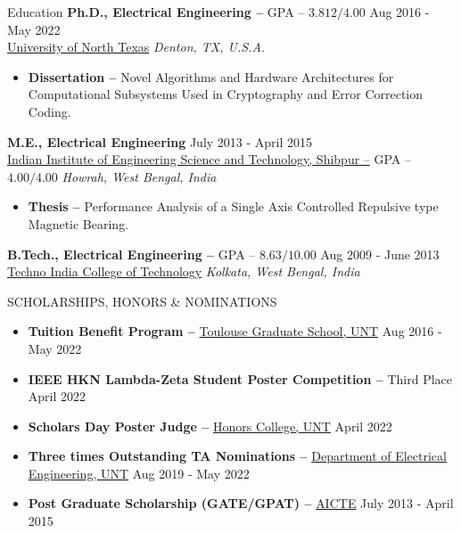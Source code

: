 \documentclass{resume} %
\begin{document}
\begin{rSection}{Education}
    \textbf{Ph.D., Electrical Engineering --} GPA -- $3.812/4.00$ \hfill Aug 2016 - May 2022 \\
    \href{https://www.unt.edu}{University of North Texas} \hfill \textit{Denton, TX, U.S.A.}
        \begin{itemize}
            \itemsep -3pt {} 
            \item \textbf{Dissertation --} Novel Algorithms and Hardware Architectures for Computational Subsystems Used in Cryptography and Error Correction Coding.
        \end{itemize}
    
    \textbf{M.E., Electrical Engineering} \hfill July 2013 - April 2015 \\
    \href{https://www.iiests.ac.in}{Indian Institute of Engineering Science and Technology, Shibpur --} GPA -- $4.00/4.00$ \hfill \textit{Howrah, West Bengal, India}
        \begin{itemize}
            \itemsep -3pt {} 
            \item \textbf{Thesis --} Performance Analysis of a Single Axis Controlled Repulsive type Magnetic Bearing.
        \end{itemize}
    
    \textbf{B.Tech., Electrical Engineering --} GPA -- $8.63/10.00$ \hfill Aug 2009 - June 2013 \\
    \href{https://tint.edu.in}{Techno India College of Technology} \hfill \textit{Kolkata, West Bengal, India}
\end{rSection}

\begin{rSection}{SCHOLARSHIPS, HONORS \& NOMINATIONS}
    \begin{itemize}
        \itemsep -3pt {} 
        \item \textbf{Tuition Benefit Program --} \href{https://tgs.unt.edu/toulouse-graduate-school}{Toulouse Graduate School, UNT} \hfill Aug 2016 - May 2022
        \item \textbf{IEEE HKN Lambda-Zeta Student Poster Competition --} Third Place \hfill April 2022
        \item \textbf{Scholars Day Poster Judge --} \href{https://honors.unt.edu}{Honors College, UNT} \hfill April 2022
        \item \textbf{Three times Outstanding TA Nominations --} \href{https://electrical.engineering.unt.edu}{Department of Electrical Engineering, UNT} \hfill Aug 2019 - May 2022
        \item \textbf{Post Graduate Scholarship (GATE/GPAT) --} \href{https://www.aicte-india.org/schemes/students-development-schemes/PG-Scholarship-Scheme}{AICTE} \hfill July 2013 - April 2015
    \end{itemize}
\end{rSection}
\end{document}
